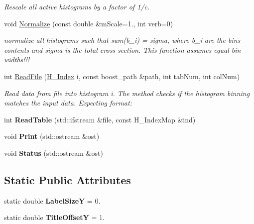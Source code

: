 \begin{DoxyCompactItemize}
\begin{DoxyCompactList}\small\item\em Rescale all active histograms by a factor of 1/c. \end{DoxyCompactList}\item 
void \hyperlink{classHistArray_a2c7edebf7ddf7d5dcc2cbb30f46601e5}{Normalize} (const double \&m\+Scale=1., int verb=0)
\begin{DoxyCompactList}\small\item\em normalize all histograms such that sum(b\+\_\+i) = sigma, where b\+\_\+i are the bins contents and sigma is the total cross section. This function assumes equal bin widths!!! \end{DoxyCompactList}\item 
int \hyperlink{classHistArray_a86df487949773c027114237875ba7c94}{Read\+File} (\hyperlink{HistArray_8h_abdf25c9f0ab78c4243f63cb2bacf26d9}{H\+\_\+\+Index} i, const boost\+\_\+path \&path, int tab\+Num, int col\+Num)
\begin{DoxyCompactList}\small\item\em Read data from file into histogram \textquotesingle{}i\textquotesingle{}. The method checks if the histogram binning matches the input data. Expecting format\+: \end{DoxyCompactList}\item 
\hypertarget{classHistArray_a6ae2aa8b442f3dd9680964d2b5ad6809}{}int {\bfseries Read\+Table} (std\+::ifstream \&file, const H\+\_\+\+Index\+Map \&ind)\label{classHistArray_a6ae2aa8b442f3dd9680964d2b5ad6809}

\item 
\hypertarget{classHistArray_adb997e3f81ccdf02e7964dcbac1bff6e}{}void {\bfseries Print} (std\+::ostream \&ost)\label{classHistArray_adb997e3f81ccdf02e7964dcbac1bff6e}

\item 
\hypertarget{classHistArray_a1e56292db3641c5b80aaf0eb089b2d41}{}void {\bfseries Status} (std\+::ostream \&ost)\label{classHistArray_a1e56292db3641c5b80aaf0eb089b2d41}

\end{DoxyCompactItemize}
\subsection*{Static Public Attributes}
\begin{DoxyCompactItemize}
\item 
\hypertarget{classHistArray_aa412b087fd57054299b360d56aea1aa0}{}static double {\bfseries Label\+Size\+Y} = 0.\label{classHistArray_aa412b087fd57054299b360d56aea1aa0}

\item 
\hypertarget{classHistArray_a80007e442f992220a29883040013931e}{}static double {\bfseries Title\+Offset\+Y} = 1.\label{classHistArray_a80007e442f992220a29883040013931e}

\end{DoxyCompactItemize}
